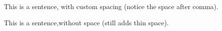 \documentclass{article}
\begin{document}
This is a sentence, with custom spacing (notice the space after comma).

This is a sentence,without space (still adds thin space).
\end{document}
